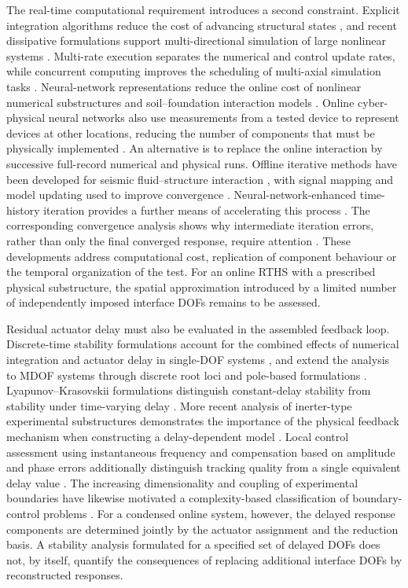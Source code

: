 \documentclass[a4paper,fleqn,review,12pt]{cas-sc}
\begin{document}
The real-time computational requirement introduces a second constraint. Explicit integration algorithms reduce the cost of advancing structural states \cite{ChenCR2008}, and recent dissipative formulations support multi-directional simulation of large nonlinear systems \cite{AlSubCD2024}. Multi-rate execution separates the numerical and control update rates, while concurrent computing improves the scheduling of multi-axial simulation tasks \cite{TaoMulti2024,Sudvarg2024}. Neural-network representations reduce the online cost of nonlinear numerical substructures and soil--foundation interaction models \cite{ChenNN2024,AlSubNN2024}. Online cyber-physical neural networks also use measurements from a tested device to represent devices at other locations, reducing the number of components that must be physically implemented \cite{MalikNN2025}. An alternative is to replace the online interaction by successive full-record numerical and physical runs. Offline iterative methods have been developed for seismic fluid--structure interaction \cite{HuOffline2024}, with signal mapping and model updating used to improve convergence \cite{HuIntegrated2025,HuSequence2025}. Neural-network-enhanced time-history iteration provides a further means of accelerating this process \cite{Peng2025}. The corresponding convergence analysis shows why intermediate iteration errors, rather than only the final converged response, require attention \cite{HuangGreen2026}. These developments address computational cost, replication of component behaviour or the temporal organization of the test. For an online RTHS with a prescribed physical substructure, the spatial approximation introduced by a limited number of independently imposed interface DOFs remains to be assessed.

Residual actuator delay must also be evaluated in the assembled feedback loop. Discrete-time stability formulations account for the combined effects of numerical integration and actuator delay in single-DOF systems \cite{ChenStability2008}, and extend the analysis to MDOF systems through discrete root loci and pole-based formulations \cite{Zhu2015,Li2021}. Lyapunov--Krasovskii formulations distinguish constant-delay stability from stability under time-varying delay \cite{Huang2019}. More recent analysis of inerter-type experimental substructures demonstrates the importance of the physical feedback mechanism when constructing a delay-dependent model \cite{TaoInerter2025}. Local control assessment using instantaneous frequency and compensation based on amplitude and phase errors additionally distinguish tracking quality from a single equivalent delay value \cite{XuInst2024,XuAmp2025}. The increasing dimensionality and coupling of experimental boundaries have likewise motivated a complexity-based classification of boundary-control problems \cite{Zhan2026}. For a condensed online system, however, the delayed response components are determined jointly by the actuator assignment and the reduction basis. A stability analysis formulated for a specified set of delayed DOFs does not, by itself, quantify the consequences of replacing additional interface DOFs by reconstructed responses.
\end{document}
